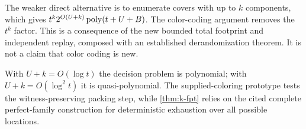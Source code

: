 The weaker direct alternative is to enumerate covers with up to $k$
components, which gives $t^k2^{O(U+k)}\operatorname{poly}(t+U+B)$. The color-coding
argument removes the $t^k$ factor. This is a consequence of the new bounded
total footprint and independent replay, composed with an established
derandomization theorem. It is not a claim that color coding is new.

With $U+k=O(\log t)$ the decision problem is polynomial; with
$U+k=O(\log^2 t)$ it is quasi-polynomial. The supplied-coloring prototype
tests the witness-preserving packing step, while \cref{thm:k-fpt} relies
on the cited complete perfect-family construction for deterministic
exhaustion over all possible locations.
